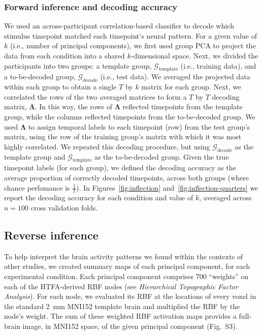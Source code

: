 \documentclass[english, 11pt]{article}
\newcommand{\componentBrains}{S3}
\begin{document}
\subsubsection*{Forward inference and decoding accuracy}

We used an across-participant correlation-based classifier to decode which
stimulus timepoint matched each timepoint's neural pattern. For a given value
of $k$ (i.e., number of principal components), we first used group PCA to
project the data from each condition into a shared $k$-dimensional space. Next,
we divided the participants into two groups: a template group,
$\mathcal{G}_{\mathrm{template}}$ (i.e., training data), and a to-be-decoded
group, $\mathcal{G}_{\mathrm{decode}}$ (i.e., test data). We averaged the
projected data within each group to obtain a single $T$ by $k$ matrix for each
group. Next, we correlated the rows of the two averaged matrices to form a $T$
by $T$ decoding matrix, $\mathbf{\Lambda}$. In this way, the rows of
$\mathbf{\Lambda}$ reflected timepoints from the template group, while the
columns reflected timepoints from the to-be-decoded group. We used
$\mathbf{\Lambda}$ to assign temporal labels to each timepoint (row) from the
test group's matrix, using the row of the training group's matrix with which it
was most highly correlated. We repeated this decoding procedure, but using
$\mathcal{G}_{\mathrm{decode}}$ as the template group and
$\mathcal{G}_{\mathrm{template}}$ as the to-be-decoded group. Given the true
timepoint labels (for each group), we defined the decoding accuracy as the
average proportion of correctly decoded timepoints, across both groups (where
chance perfomance is $\frac{1}{T}$). In Figures~\ref{fig:inflection}
and~\ref{fig:inflection-quarters} we report the decoding accuracy for each
condition and value of $k$, averaged across $n = 100$ cross validation folds.

\subsection*{Reverse inference}

To help interpret the brain activity patterns we found within the contexts of
other studies, we created summary maps of each principal component, for each
experimental condition. Each principal component comprises 700 ``weights'' on
each of the HTFA-derived RBF nodes (see \textit{Hierarchical Topographic Factor
Analysis}). For each node, we evaluated its RBF at the locations of every voxel
in the standard 2~mm MNI152 template brain and multiplied the RBF by the node's
weight. The sum of these weighted RBF activation maps provides a full-brain
image, in MNI152 space, of the given principal component (Fig.~\componentBrains).
\end{document}
